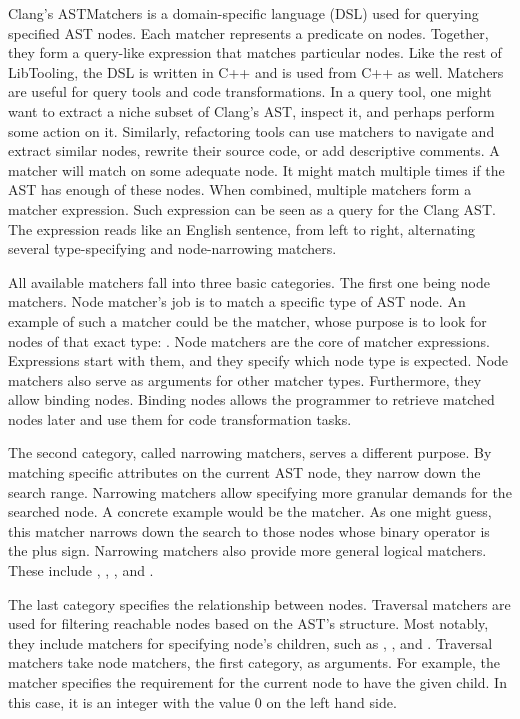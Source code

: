 Clang's ASTMatchers is a domain-specific language (DSL) used for querying 
specified AST nodes. 
Each matcher represents a predicate on nodes. 
Together, they form a query-like expression that matches particular nodes. 
Like the rest of LibTooling, the DSL is written in C++ and is used from 
C++ as well.
Matchers are useful for query tools and code transformations. 
In a query tool, one might want to extract a niche subset of Clang's AST, 
inspect it, and perhaps perform some action on it. 
Similarly, refactoring tools can use matchers to navigate and extract 
similar nodes, rewrite their source code, or add descriptive comments.
A matcher will match on some adequate node. 
It might match multiple times if the AST has enough of these nodes. 
When combined, multiple matchers form a matcher expression. 
Such expression can be seen as a query for the Clang AST. 
The expression reads like an English sentence, from left to right, 
alternating several type-specifying and node-narrowing matchers.

All available matchers fall into three basic categories. 
The first one being node matchers. 
Node matcher's job is to match a specific type of AST node. 
An example of such a matcher could be the  
matcher, whose purpose is to look for nodes of that exact 
type: . 
Node matchers are the core of matcher expressions. 
Expressions start with them, and they specify which node type is expected. 
Node matchers also serve as arguments for other matcher types. 
Furthermore, they allow binding nodes. 
Binding nodes allows the programmer to retrieve matched nodes later and 
use them for code transformation tasks. 

The second category, called narrowing matchers, serves a different purpose. 
By matching specific attributes on the current AST node, they narrow down 
the search range. 
Narrowing matchers allow specifying more granular demands for the searched 
node. 
A concrete example would be the  matcher. 
As one might guess, this matcher narrows down the search to those nodes 
whose binary operator is the plus sign. 
Narrowing matchers also provide more general logical matchers. 
These include , , , 
and .

The last category specifies the relationship between nodes. 
Traversal matchers are used for filtering reachable nodes based on 
the AST's structure. 
Most notably, they include matchers for specifying node's children, 
such as , , and . 
Traversal matchers take node matchers, the first category, as arguments. 
For example, the  matcher specifies
the requirement for the current node to have the given child. 
In this case, it is an integer with the value 0 on the left hand side.

